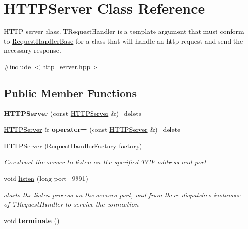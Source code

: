 \hypertarget{class_h_t_t_p_server}{}\section{H\+T\+T\+P\+Server Class Reference}
\label{class_h_t_t_p_server}


H\+T\+TP server class.  T\+Request\+Handler is a template argument that must conform to \hyperlink{class_request_handler_base}{Request\+Handler\+Base} for a class that will handle an http request and send the necessary response.  




{\ttfamily \#include $<$http\+\_\+server.\+hpp$>$}

\subsection*{Public Member Functions}
\begin{DoxyCompactItemize}
\item 
\mbox{\label{class_h_t_t_p_server_a3ccc2f74d6b566df84a08155a81dbf33}} 
{\bfseries H\+T\+T\+P\+Server} (const \hyperlink{class_h_t_t_p_server}{H\+T\+T\+P\+Server} \&)=delete
\item 
\mbox{\label{class_h_t_t_p_server_af0ff3249ee7308563225f0470f449ead}} 
\hyperlink{class_h_t_t_p_server}{H\+T\+T\+P\+Server} \& {\bfseries operator=} (const \hyperlink{class_h_t_t_p_server}{H\+T\+T\+P\+Server} \&)=delete
\item 
\hyperlink{class_h_t_t_p_server_a5a5f52fff7b98136607a692aa06d8ba4}{H\+T\+T\+P\+Server} (Request\+Handler\+Factory factory)
\begin{DoxyCompactList}\small\item\em Construct the server to listen on the specified T\+CP address and port. \end{DoxyCompactList}\item 
\mbox{\label{class_h_t_t_p_server_aece3ed957213b41813b5eafff259ad9d}} 
void \hyperlink{class_h_t_t_p_server_aece3ed957213b41813b5eafff259ad9d}{listen} (long port=9991)
\begin{DoxyCompactList}\small\item\em starts the listen process on the servers port, and from there dispatches instances of T\+Request\+Handler to service the connection \end{DoxyCompactList}\item 
\mbox{\label{class_h_t_t_p_server_a263a0e7cedafc3def65be6278e894dbc}} 
void {\bfseries terminate} ()
\end{DoxyCompactItemize}
